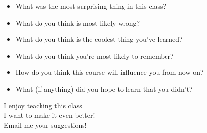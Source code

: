 \documentclass[a4paper,landscape,headrule,footrule,xetex]{foils}
\begin{document}
\begin{itemize}
\item What was the most surprising thing in this class?
\item What do you think is most likely wrong?
\item What do you think is the coolest thing you've learned?
\item What do you think you're most likely to
remember?
\item How do you think this course will influence you from now on?
\item What (if anything) did you hope to learn that you didn't?
\end{itemize}
\bigskip\bigskip
\begin{center}
  I enjoy teaching this class \\
  I  want to make it even better! \\
  Email me your suggestions!
\end{center}
\end{document}
